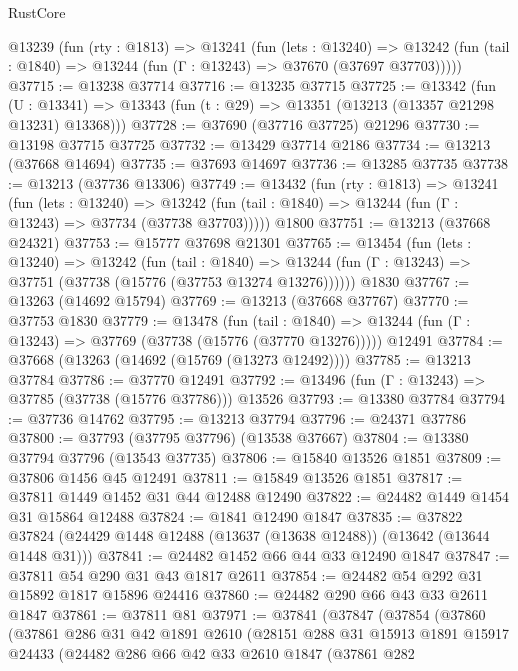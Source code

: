 \begin{lexlean}{RustCore}
\begin{coremodule}
  @13239
    (fun (rty : @1813) =>
    @13241
      (fun (lets : @13240) =>
      @13242 (fun (tail : @1840) => @13244 (fun (Γ : @13243) => @37670 (@37697 @37703)))))
@37715 := @13238 @37714
@37716 := @13235 @37715
@37725 := @13342
    (fun (U : @13341) => @13343 (fun (t : @29) => @13351 (@13213 (@13357 @21298 @13231) @13368)))
@37728 := @37690 (@37716 @37725) @21296
@37730 := @13198 @37715 @37725
@37732 := @13429 @37714 @2186
@37734 := @13213 (@37668 @14694)
@37735 := @37693 @14697
@37736 := @13285 @37735
@37738 := @13213 (@37736 @13306)
@37749 := @13432
    (fun (rty : @1813) =>
    @13241
      (fun (lets : @13240) =>
      @13242 (fun (tail : @1840) => @13244 (fun (Γ : @13243) => @37734 (@37738 @37703)))))
    @1800
@37751 := @13213 (@37668 @24321)
@37753 := @15777 @37698 @21301
@37765 := @13454
    (fun (lets : @13240) =>
    @13242
      (fun (tail : @1840) =>
      @13244 (fun (Γ : @13243) => @37751 (@37738 (@15776 (@37753 @13274 @13276))))))
    @1830
@37767 := @13263 (@14692 @15794)
@37769 := @13213 (@37668 @37767)
@37770 := @37753 @1830
@37779 := @13478
    (fun (tail : @1840) => @13244 (fun (Γ : @13243) => @37769 (@37738 (@15776 (@37770 @13276)))))
    @12491
@37784 := @37668 (@13263 (@14692 (@15769 (@13273 @12492))))
@37785 := @13213 @37784
@37786 := @37770 @12491
@37792 := @13496 (fun (Γ : @13243) => @37785 (@37738 (@15776 @37786))) @13526
@37793 := @13380 @37784
@37794 := @37736 @14762
@37795 := @13213 @37794
@37796 := @24371 @37786
@37800 := @37793 (@37795 @37796) (@13538 @37667)
@37804 := @13380 @37794 @37796 (@13543 @37735)
@37806 := @15840 @13526 @1851
@37809 := @37806 @1456 @45 @12491
@37811 := @15849 @13526 @1851
@37817 := @37811 @1449 @1452 @31 @44 @12488 @12490
@37822 := @24482 @1449 @1454 @31 @15864 @12488
@37824 := @1841 @12490 @1847
@37835 := @37822 @37824 (@24429 @1448 @12488 (@13637 (@13638 @12488)) (@13642 (@13644 @1448 @31)))
@37841 := @24482 @1452 @66 @44 @33 @12490 @1847
@37847 := @37811 @54 @290 @31 @43 @1817 @2611
@37854 := @24482 @54 @292 @31 @15892 @1817 @15896 @24416
@37860 := @24482 @290 @66 @43 @33 @2611 @1847
@37861 := @37811 @81
@37971 := @37841
    (@37847
      (@37854
        (@37860
          (@37861
            @286
            @31
            @42
            @1891
            @2610
            (@28151
              @288
              @31
              @15913
              @1891
              @15917
              @24433
              (@24482
                @286
                @66
                @42
                @33
                @2610
                @1847
                (@37861
                  @282

\end{coremodule}
\end{lexlean}
